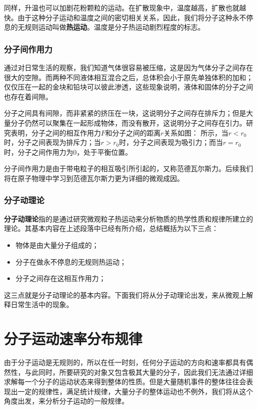 同样，升温也可以加剧花粉颗粒的运动。在扩散现象中，温度越高，扩散也就越快。由于这种分子运动和温度之间的密切相关关系，因此，我们将分子这种永不停息的无规则运动叫做\textbf{热运动}。温度是分子热运动剧烈程度的标志。

\subsubsection{分子间作用力}
通过对日常生活的观察，我们知道气体很容易被压缩，这是因为气体分子之间存在很大的空隙。而两种不同液体相互混合之后，总体积会小于原先单独体积的加和；仅仅压在一起的金块和铅块可以彼此渗透，这些现象说明，液体和固体的分子之间也存在着间隙。

分子之间具有间隙，而非紧紧的挤压在一块，这说明分子之间存在排斥力；但是大量分子仍然可以聚集在一起形成物体，而没有散开，这说明分子之间存在引力。研究表明，分子之间的相互作用力$F$和分子之间的距离$r$关系如图：
所示，当$r<r_0$时，分子之间表现为排斥力；当$r>r_0$时，分子之间表现为吸引力；而当$r=r_0$时，分子之间作用力为$0$，处于平衡位置。

分子间作用力是由于带电粒子的相互吸引所引起的，又称范德瓦尔斯力。后续我们将在原子物理中学习到范德瓦尔斯力更为详细的微观成因。
\subsubsection{分子动理论}
\textbf{分子动理论}指的是通过研究微观粒子热运动来分析物质的热学性质和规律所建立的理论。其基本内容在上述段落中已经有所介绍，总结概括为以下三点：
\begin{itemize}
\item 物体是由大量分子组成的；
\item  分子在做永不停息的无规则热运动；
\item 分子之间存在这相互作用力；
\end{itemize}这三点就是分子动理论的基本内容。下面我们将从分子动理论出发，来从微观上解释日常生活中的现象。

\section{分子运动速率分布规律}
由于分子运动是无规则的，所以在任一时刻，任何分子运动的方向和速率都具有偶然性，与此同时，所要研究的对象又包含极其大量的分子，因此我们无法通过详细求解每一个分子的运动状态来得到整体的性质。但是大量随机事件的整体往往会表现出一定的规律性，满足统计规律，大量分子的整体运动也不例外，我们将从这个角度出发，来分析分子运动的一般规律。


